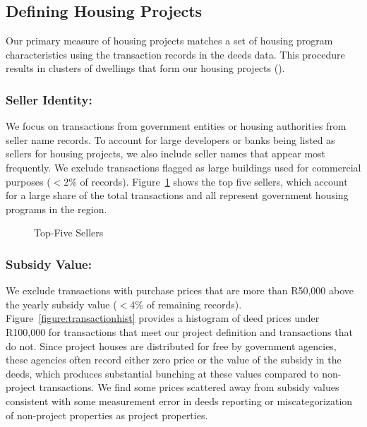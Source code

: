 \documentclass[12pt]{article}
\begin{document}
\subsection{Defining Housing Projects}

Our primary measure of housing projects matches a set of housing program characteristics using the transaction records in the deeds data.  This procedure results in clusters of dwellings that form our housing projects (\cite{serihistory}).



\subsubsection{Seller Identity:}
We focus on transactions from government entities or housing authorities from seller name records.  To account for large developers or banks being listed as sellers for housing projects, we also include seller names that appear most frequently.  We exclude transactions flagged as large buildings used for commercial purposes ($<$2\% of records).  Figure~\ref{figure:topfivesellers} shows the top five sellers, which account for a large share of the total transactions and all represent government housing programs in the region.  

\begin{figure}
\caption{Top-Five Sellers}\label{figure:topfivesellers}
\centering

\end{figure}


\subsubsection{Subsidy Value:}

We exclude transactions with purchase prices that are more than R50,000 above the yearly subsidy value ($<$4\% of remaining records).  Figure~\ref{figure:transactionhist} provides a histogram of deed prices under R100,000 for transactions that meet our project definition and transactions that do not.  Since project houses are distributed for free by government agencies, these agencies often record either zero price or the value of the subsidy in the deeds, which produces substantial bunching at these values compared to non-project transactions.  We find some prices scattered away from subsidy values consistent with some measurement error in deeds reporting or miscategorization of non-project properties as project properties.  
\end{document}
